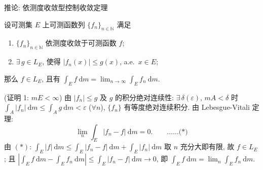 \begin{frame}{推论: 依测度收敛型控制收敛定理}

\begin{cor}[依测度型控制收敛]
设可测集 $E$ 上可测函数列 $\{f_n\}_{n \in \mathbb{N}}$ 满足
\begin{enumerate}
\item $\{f_n\}_{n \in \mathbb{N}}$ \alert{依测度}收敛于可测函数 $f$;
\item $\exists\, g \in L_E$, 使得 $|f_n(x)| \leqslant g(x)$, a.e.\ $x \in E$;
\end{enumerate}
那么 $f \in L_E$, 且有 $\displaystyle \int_E f ~ \mathrm{d} m = \lim_{n \to \infty} \int_E f_n ~ \mathrm{d} m$.
\end{cor}

\startproof[bg=yellow, fg=red](证明 1\textdegree: $mE < \infty$)
由 $|f_n| \leqslant g$ 及 $g$ 的积分绝对连续性: $\exists\, \delta(\varepsilon)$,
$mA < \delta$ 时 $\int_A |f_n| ~ \mathrm{d} m \leqslant \int_A g ~ \mathrm{d} m < \varepsilon$
($\forall n$), $\{f_n\}$ 有等度绝对连续积分. 由 Lebesgue-Vitali 定理:
\[
\lim_n \int_E |f_n - f| ~ \mathrm{d} m = 0 .
\qquad \text{……(*)}
\]
由 $(*)$: $\int_E |f| ~ \mathrm{d} m \leqslant \int_E |f_n - f| ~ \mathrm{d} m + \int_E |f_n| ~ \mathrm{d} m$
取 $n$ 充分大即有限, 故 $f \in L_E$; 且
$|\int_E f ~ \mathrm{d} m - \int_E f_n ~ \mathrm{d} m| \leqslant \int_E |f_n - f| ~ \mathrm{d} m \to 0$,
即 $\int_E f ~ \mathrm{d} m = \lim_n \int_E f_n ~ \mathrm{d} m$.

\end{frame}


